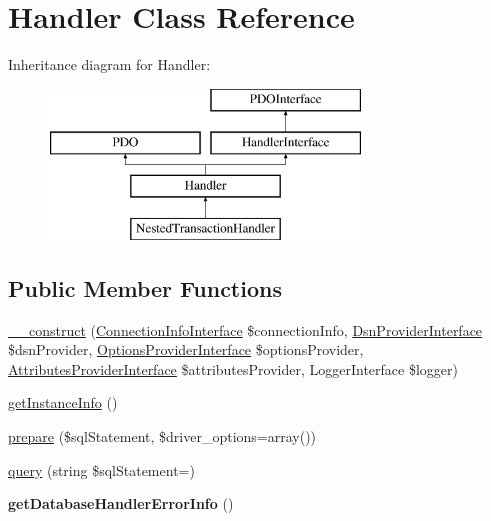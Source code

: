 \hypertarget{class_pes_1_1_database_1_1_handler_1_1_handler}{}\section{Handler Class Reference}
\label{class_pes_1_1_database_1_1_handler_1_1_handler}
Inheritance diagram for Handler\+:\begin{figure}[H]
\begin{center}
\leavevmode
\includegraphics[height=4.000000cm]{class_pes_1_1_database_1_1_handler_1_1_handler}
\end{center}
\end{figure}
\subsection*{Public Member Functions}
\begin{DoxyCompactItemize}
\item 
\mbox{\hyperlink{class_pes_1_1_database_1_1_handler_1_1_handler_acee29348571a4eefdc011645312606e3}{\+\_\+\+\_\+construct}} (\mbox{\hyperlink{interface_pes_1_1_database_1_1_handler_1_1_connection_info_interface}{Connection\+Info\+Interface}} \$connection\+Info, \mbox{\hyperlink{interface_pes_1_1_database_1_1_handler_1_1_dsn_provider_1_1_dsn_provider_interface}{Dsn\+Provider\+Interface}} \$dsn\+Provider, \mbox{\hyperlink{interface_pes_1_1_database_1_1_handler_1_1_options_provider_1_1_options_provider_interface}{Options\+Provider\+Interface}} \$options\+Provider, \mbox{\hyperlink{interface_pes_1_1_database_1_1_handler_1_1_attributes_provider_1_1_attributes_provider_interface}{Attributes\+Provider\+Interface}} \$attributes\+Provider, Logger\+Interface \$logger)
\item 
\mbox{\hyperlink{class_pes_1_1_database_1_1_handler_1_1_handler_ad86fa5498ac1054e414a91fa4a6a7dfd}{get\+Instance\+Info}} ()
\item 
\mbox{\hyperlink{class_pes_1_1_database_1_1_handler_1_1_handler_a813f4f79dd359e1e6f4f45263868a8f4}{prepare}} (\$sql\+Statement, \$driver\+\_\+options=array())
\item 
\mbox{\hyperlink{class_pes_1_1_database_1_1_handler_1_1_handler_af95be9a555ad9442030489215c290753}{query}} (string \$sql\+Statement=\textquotesingle{}\textquotesingle{})
\item 
\mbox{\label{class_pes_1_1_database_1_1_handler_1_1_handler_ac76c1372f39af2fe77daeca9b3445190}} 
{\bfseries get\+Database\+Handler\+Error\+Info} ()
\end{DoxyCompactItemize}
